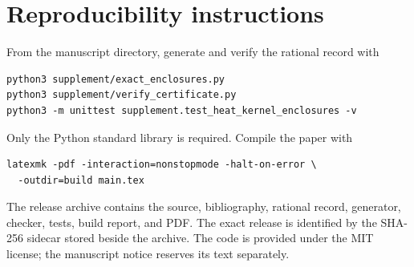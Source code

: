 \section{Reproducibility instructions}\label{app:reproducibility}

From the manuscript directory, generate and verify the rational record with
\begin{verbatim}
python3 supplement/exact_enclosures.py
python3 supplement/verify_certificate.py
python3 -m unittest supplement.test_heat_kernel_enclosures -v
\end{verbatim}
Only the Python standard library is required.  Compile the paper with
\begin{verbatim}
latexmk -pdf -interaction=nonstopmode -halt-on-error \
  -outdir=build main.tex
\end{verbatim}
The release archive contains the source, bibliography, rational record,
generator, checker, tests, build report, and PDF.  The exact release is
identified by the SHA-256 sidecar stored beside the archive.  The code is
provided under the MIT license; the manuscript notice reserves its text
separately.
